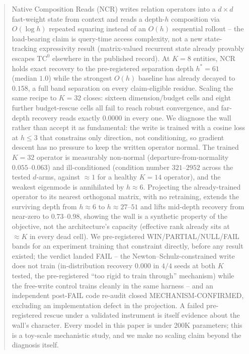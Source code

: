 \begin{abstract}
Native Composition Reads (NCR) writes relation operators into a $d\times d$
fast-weight state from context and reads a depth-$h$ composition via
$O(\log h)$ repeated squaring instead of an $O(h)$ sequential rollout --
the load-bearing claim is query-time access complexity, not a new
state-tracking expressivity result (matrix-valued recurrent state already
provably escapes $\mathrm{TC}^0$ elsewhere in the published record). At
$K{=}8$ entities, NCR holds exact recovery to the pre-registered separation
depth $h^\ast{=}61$ (median $1.0$) while the strongest $O(h)$ baseline has
already decayed to $0.158$, a full band separation on every claim-eligible
residue. %
Scaling the same recipe to $K{=}32$ closes: sixteen dimension/budget cells
and eight further budget-rescue cells all fail to reach robust
convergence, and far-depth recovery reads exactly $0.0000$ in every one.
We diagnose the wall rather than accept it as fundamental: the write is
trained with a cosine loss at $h\le 3$ that constrains only direction, not
conditioning, so gradient descent has no pressure to keep the written
operator normal. The trained $K{=}32$ operator is measurably non-normal
(departure-from-normality $0.055$--$0.063$) and ill-conditioned (condition
number $321$--$2952$ across the tested $d$-arms, against $\approx 1$ for a
healthy $K{=}14$ operator), and the weakest eigenmode is annihilated by
$h\approx 6$. %
Projecting the already-trained operator to its nearest orthogonal matrix,
with no retraining, extends the surviving depth from $h\approx 6$ to
$h\approx 27$--$51$ and lifts mid-depth recovery from near-zero to
$0.73$--$0.98$, showing the wall is a synthetic property of the objective,
not the architecture's capacity (effective rank already sits at $\approx K$
in every dead cell). %
We pre-registered WIN/PARTIAL/NULL/FAIL bands for an experiment training
that constraint directly, before any result existed; the verdict landed
FAIL -- the Newton--Schulz-constrained write does not train (in-distribution
recovery $0.000$ in $4/4$ seeds at both $K$ tested, the pre-registered
``too rigid to train through'' mechanism) while the free-write control
trains cleanly in the same harness -- and an independent post-FAIL code
re-audit closed MECHANISM-CONFIRMED, excluding an implementation defect
in the projection. A failed pre-registered rescue under a validated
instrument is itself evidence about the wall's character. Every model in this
paper is under 200K parameters; this is a toy-scale mechanistic study, and
we make no scaling claim beyond the diagnosis itself.
\end{abstract}
